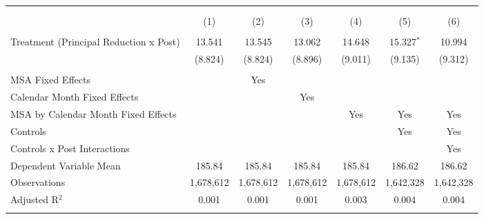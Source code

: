 
\begin{tabular}{@{\extracolsep{5pt}}lcccccc} 
\\[-1.8ex]\hline 
\hline \\[-1.8ex] 
\\[-1.8ex] & (1) & (2) & (3) & (4) & (5) & (6)\\ 
\hline \\[-1.8ex] 
 Treatment (Principal Reduction x Post) & 13.541 & 13.545 & 13.062 & 14.648 & 15.327$^{*}$ & 10.994 \\ 
  & (8.824) & (8.824) & (8.896) & (9.011) & (9.135) & (9.312) \\ 
 \hline \\[-1.8ex] 
MSA Fixed Effects &  & Yes &  &  &  &  \\ 
Calendar Month Fixed Effects &  &  & Yes &  &  &  \\ 
MSA by Calendar Month Fixed Effects &  &  &  & Yes & Yes & Yes \\ 
Controls &  &  &  &  & Yes & Yes \\ 
Controls x Post Interactions &  &  &  &  &  & Yes \\ 
Dependent Variable Mean & 185.84 & 185.84 & 185.84 & 185.84 & 186.62 & 186.62 \\ 
Observations & 1,678,612 & 1,678,612 & 1,678,612 & 1,678,612 & 1,642,328 & 1,642,328 \\ 
Adjusted R$^{2}$ & 0.001 & 0.001 & 0.001 & 0.003 & 0.004 & 0.004 \\ 
\hline 
\hline \\[-1.8ex] 
\end{tabular} 

